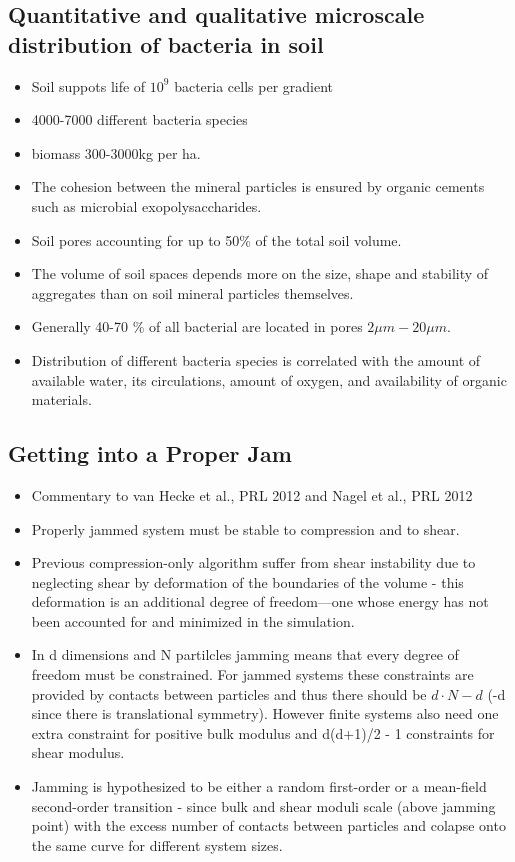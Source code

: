 \documentclass[10pt,a4paper]{article}
\begin{document}
 \subsection{Quantitative and qualitative microscale distribution of bacteria in soil \cite{rr01}}
 \begin{itemize}
  \item Soil suppots life of $10^9$ bacteria cells per gradient
  \item 4000-7000 different bacteria species 
  \item biomass 300-3000kg per ha.
  \item The cohesion between the mineral particles is ensured by organic cements such as microbial exopolysaccharides.
  \item Soil pores accounting for up to 50\% of the total soil volume.
  \item The volume of soil spaces depends more on the size, shape and stability of aggregates than on soil mineral particles themselves.
  \item Generally 40-70 \% of all bacterial are located in pores $2\mu m - 20 \mu m$.
  \item Distribution of different bacteria species is correlated with the amount of available water, its circulations, amount of oxygen, and availability of organic materials.
 \end{itemize}
 
 \subsection{Getting into a Proper Jam \cite{corwin12}}
 \begin{itemize}
  \item Commentary to van Hecke et al., PRL 2012 and Nagel et al., PRL 2012
  \item Properly jammed system must be stable to compression and to shear. 
  \item Previous compression-only algorithm suffer from shear instability due to neglecting shear by deformation of the boundaries of the volume - this deformation is an additional degree of freedom—one whose energy has not been accounted for and minimized in the simulation.
  \item In d dimensions and N partilcles jamming means that every degree of freedom must be constrained. 
  For jammed systems these constraints are provided by contacts between particles and thus there should be $d \cdot N - d$  (-d since there is translational symmetry).
  However finite systems also need one extra constraint for positive bulk modulus and d(d+1)/2 - 1 constraints for shear modulus.
  \item Jamming is hypothesized to be  either a random first-order or a mean-field second-order transition - since bulk and shear moduli 
  scale (above jamming point) with the excess number of contacts between particles and colapse onto the same curve for different system sizes.

 \end{itemize}
\end{document}

